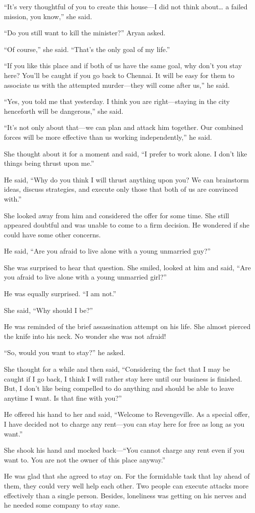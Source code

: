 “It's very thoughtful of you to create this house—I did not think about…
a failed mission, you know,” she said.

“Do you still want to kill the minister?” Aryan asked.

“Of course,” she said. “That's the only goal of my life.”

“If you like this place and if both of us have the same goal, why don't you stay
here? You'll be caught if you go back to Chennai. It will be easy for them to
associate us with the attempted murder—they will come after us,” he said.

“Yes, you told me that yesterday. I think you are right—staying in the city
henceforth will be dangerous,” she said.

“It's not only about that—we can plan and attack him together. Our combined
forces will be more effective than us working independently,” he said.

She thought about it for a moment and said, “I prefer to work alone. I don't
like things being thrust upon me.”

He said, “Why do you think I will thrust anything upon you? We can brainstorm
ideas, discuss strategies, and execute only those that both of us are convinced
with.”

She looked away from him and considered the offer for some time. She still
appeared doubtful and was unable to come to a firm decision. He wondered if she
could have some other concerns.

He said, “Are you afraid to live alone with a young unmarried guy?”

She was surprised to hear that question. She smiled, looked at him and said,
“Are you afraid to live alone with a young unmarried girl?”

He was equally surprised. “I am not.”

She said, “Why should I be?”

He was reminded of the brief assassination attempt on his life. She almost
pierced the knife into his neck. No wonder she was not afraid!

“So, would you want to stay?” he asked.

She thought for a while and then said, “Considering the fact that I may be
caught if I go back, I think I will rather stay here until our business is
finished. But, I don't like being compelled to do anything and should be able
to leave anytime I want. Is that fine with you?”

He offered his hand to her and said, “Welcome to Revengeville. As a special
offer, I have decided not to charge any rent—you can stay here for free as
long as you want.”

She shook his hand and mocked back—“You cannot charge any rent even if you
want to. You are not the owner of this place anyway.”

He was glad that she agreed to stay on. For the formidable task that lay ahead
of them, they could very well help each other. Two people can execute attacks
more effectively than a single person. Besides, loneliness was getting on his
nerves and he needed some company to stay sane.